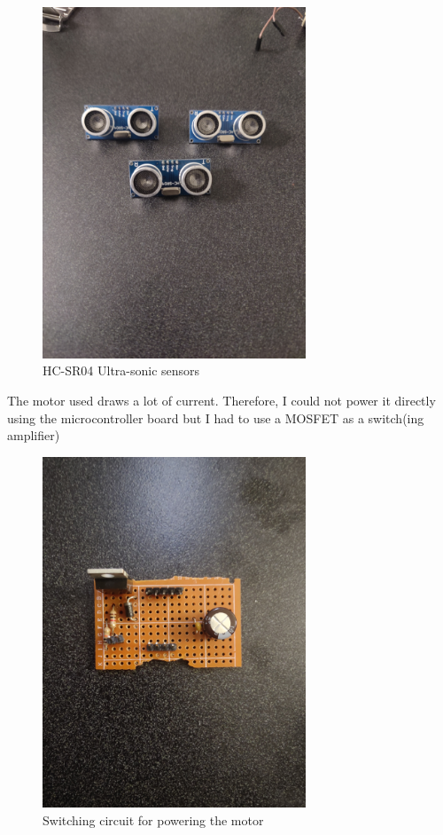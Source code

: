 \documentclass[11pt]{article}
\begin{document}
\begin{figure}[H]
\centering
\includegraphics[width=0.7\textwidth]{./images/sensors.jpg}
\caption{HC-SR04 Ultra-sonic sensors}
\end{figure}

The motor used draws a lot of current. Therefore, I could not power it directly using the microcontroller board but I had to use a MOSFET as a switch(ing amplifier)

\begin{figure}[H]
\centering
\includegraphics[width=0.7\textwidth]{./images/circuit.jpg}
\caption{Switching circuit for powering the motor}
\end{figure}
\end{document}
